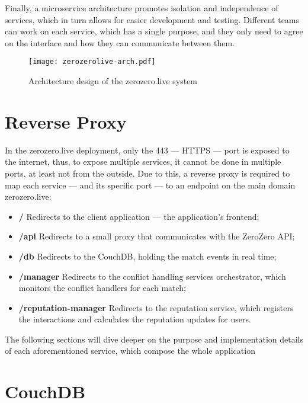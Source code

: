Finally, a microservice architecture promotes isolation and independence of services, which in turn allows for easier development and testing. Different teams can work on each service, which has a single purpose, and they only need to agree on the interface and how they can communicate between them.


\begin{figure}[h]
    \begin{center}
        \leavevmode
        \texttt{[image: zerozerolive-arch.pdf]}
        \caption{Architecture design of the zerozero.live system}
        \label{fig:services-arch}
    \end{center}
\end{figure}

\section{Reverse Proxy}

In the zerozero.live deployment, only the 443 --- HTTPS --- port is exposed to the internet, thus, to expose multiple services, it cannot be done in multiple ports, at least not from the outside. Due to this, a reverse proxy is required to map each service --- and its specific port --- to an endpoint on the main domain zerozero.live:
 
\begin{itemize}
    \item \textbf{/} Redirects to the client application --- the application's frontend;
    \item \textbf{/api} Redirects to a small proxy that communicates with the ZeroZero API;
    \item \textbf{/db} Redirects to the CouchDB, holding the match events in real time;
    \item \textbf{/manager} Redirects to the conflict handling services orchestrator, which monitors the conflict handlers for each match;
    \item \textbf{/reputation-manager} Redirects to the reputation service, which registers the interactions and calculates the reputation updates for users.
\end{itemize}

The following sections will dive deeper on the purpose and implementation details of each aforementioned service, which compose the whole application 

\section{CouchDB}


